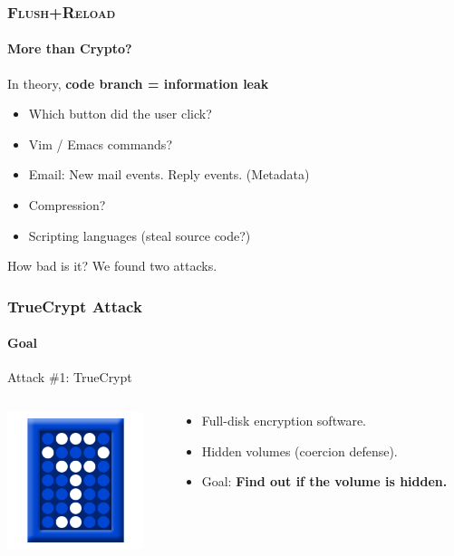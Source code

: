 \documentclass{beamer}
\begin{document}
\begin{frame}
    \frametitle{\textsc{Flush+Reload}}
    \framesubtitle{More than Crypto?}

    In theory, \textbf{code branch = information leak}

    \begin{itemize}
        \item Which button did the user click?
        \item Vim / Emacs commands?
        \item Email: New mail events. Reply events. (Metadata)
        \item Compression?
        \item Scripting languages (steal source code?)
    \end{itemize}

    How bad is it? We found two attacks.
\end{frame}


\begin{frame}
    \frametitle{TrueCrypt Attack}
    \framesubtitle{Goal}

    \begin{center}
    {\Large Attack \#1: TrueCrypt}
    \end{center}
    \begin{columns}
        \begin{column}{0.3\textwidth}
            \includegraphics[width=4cm,keepaspectratio]{tclogo.png}
        \end{column}
        \begin{column}{0.7\textwidth}
        \begin{itemize}
            \item Full-disk encryption software.
            \item Hidden volumes (coercion defense).
            \item Goal: \textbf{Find out if the volume is hidden.}
        \end{itemize}
        \end{column}
    \end{columns}

\end{frame}
\end{document}
